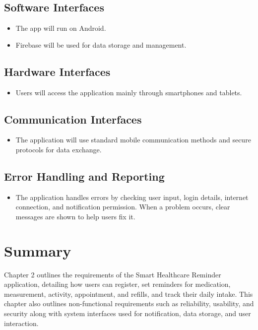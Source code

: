 \documentclass[12pt, a4paper, oneside]{report}
\begin{document}
\subsection{Software Interfaces}
\begin{itemize}
    \item The app will run on Android.
    \item Firebase will be used for data storage and management.
\end{itemize}

\subsection{Hardware Interfaces}
\begin{itemize}
    \item Users will access the application mainly through smartphones and tablets.
\end{itemize}

\subsection{Communication Interfaces}
\begin{itemize}
    \item The application will use standard mobile communication methods and secure protocols for data exchange.
\end{itemize}

\subsection{Error Handling and Reporting}
\begin{itemize}
    \item The application handles errors by checking user input, login details, internet connection, and notification permission. When a problem occurs, clear messages are shown to help users fix it.
\end{itemize}

\section{Summary}
\label{sec:ch2-summary}

Chapter 2 outlines the requirements of the Smart Healthcare Reminder application, detailing how users can register, set reminders for medication, measurement, activity, appointment, and refills, and track their daily intake. This chapter also outlines non-functional requirements such as reliability, usability, and security along with system interfaces used for notification, data storage, and user interaction.
\end{document}
